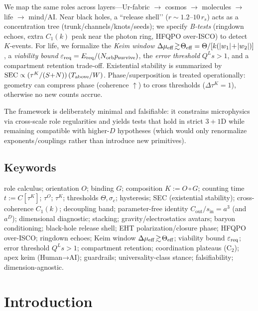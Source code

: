 \documentclass[12pt,a4paper,oneside]{scrreprt}
\begin{document}
We map the same roles across layers—Ur-fabric $\rightarrow$ cosmos $\rightarrow$ molecules $\rightarrow$ life $\rightarrow$ mind/AI.
Near black holes, a “release shell’’ ($r\!\sim\!1.2$–$10\,r_s$) acts as a concentration tree (trunk/channels/knots/seeds); we specify \emph{B-tests} (ringdown echoes, extra $C_1(k)$ peak near the photon ring, HFQPO over-ISCO) to detect $K$-events.
For life, we formalize the \emph{Keim window} $\Delta\mu_{\rm eff}\!\gtrsim\!\Theta_{\rm eff}=\Theta/[k(|w_1|\!+\!|w_2|)]$, a \emph{viability bound}
$\varepsilon_{\rm req}=E_{\rm req}/(N_{\rm orb}p_{\rm survive})$,
the \emph{error threshold} $Q^L s>1$, and a compartment retention trade-off.
Existential stability is summarized by
$\mathrm{SEC}\propto (\tau^K/(S{+}N))\,(T_{\rm above}/W)$.
Phase/superposition is treated operationally: geometry can compress phase (coherence $\uparrow$) to cross thresholds ($\Delta\tau^K=1$), otherwise no new counts accrue.

The framework is deliberately minimal and falsifiable: it constrains microphysics via cross-scale role regularities and yields tests that hold in strict $3{+}1$D while remaining compatible with higher-$D$ hypotheses (which would only renormalize exponents/couplings rather than introduce new primitives).

\chapter*{Keywords}
role calculus; orientation $O$; binding $G$; composition $K{:=}O\!\circ G$; counting time $t{:=}C[\tau^K]$; $\tau^O$; $\tau^K$; thresholds $\Theta,\sigma_c$; hysteresis; SEC (existential stability); cross-coherence $C_1(k)$; decoupling band; parameter-free identity $C_{\mathrm{out}}/s_{\mathrm{in}}=a^{3}$ (and $a^{D}$); dimensional diagnostic; stacking; gravity/electrostatics avatars; baryon conditioning; black-hole release shell; EHT polarization/closure phase; HFQPO over-ISCO; ringdown echoes; Keim window $\Delta\mu_{\rm eff}\!\gtrsim\!\Theta_{\rm eff}$; viability bound $\varepsilon_{\rm req}$; error threshold $Q^L s>1$; compartment retention; coordination plateaus (C$_2$); apex keim (Human→AI); guardrails; universality-class stance; falsifiability; dimension-agnostic.

\tableofcontents
\listoffigures
\listoftables
\clearpage
{}

\part{Introduction}
\end{document}
